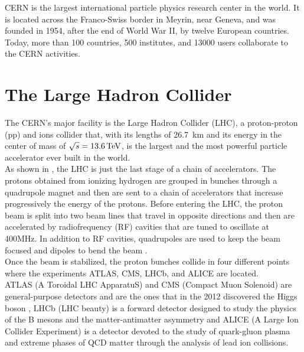 \label{sec:CMS}
\vspace{-1cm}
\minitoc

CERN is the largest international particle physics research center in the world. It is located across the Franco-Swiss border in Meyrin, near Geneva, and was founded in 1954, after the end of World War II, by twelve European countries.\\
Today, more than 100 countries, 500 institutes, and 13000 users collaborate to the CERN activities.

\section{The Large Hadron Collider}
The CERN's major facility is the Large Hadron Collider (LHC), a proton-proton (pp) and ions collider that, with its lengths of 26.7 km and its energy in the center of mass of $\sqrt{s}=13.6{\,\text{Te\hspace{-.08em}V}}$, is the largest and the most powerful particle accelerator ever built in the world.\\
As shown in , the LHC is just the last stage of a chain of accelerators. The protons obtained from ionizing hydrogen are grouped in bunches through a quadrupole magnet and then are sent to a chain of accelerators that increase progressively the energy of the protons.
Before entering the LHC, the proton beam is split into two beam lines that travel in opposite directions and then are accelerated by radiofrequency (RF) cavities that are tuned to oscillate at 400MHz. In addition to RF cavities, quadrupoles are used to keep the beam focused and dipoles to bend the beam \cite{Bruning2004LHCReport}.\\
Once the beam is stabilized, the proton bunches collide in four different points where the experiments ATLAS, CMS, LHCb, and ALICE are located.\\
ATLAS (A Toroidal LHC ApparatuS) and CMS (Compact Muon Solenoid) are general-purpose detectors and are the ones that in the 2012 discovered the Higgs boson  \cite{Chatrchyan2012ObservationLHC,Aad2012ObservationLHC}, LHCb (LHC beauty) is a forward detector designed to study the physics of the B mesons and the matter-antimatter asymmetry and ALICE (A Large Ion Collider Experiment) is a detector devoted to the study of quark-gluon plasma and extreme phases of QCD matter through the analysis of lead ion collisions.
